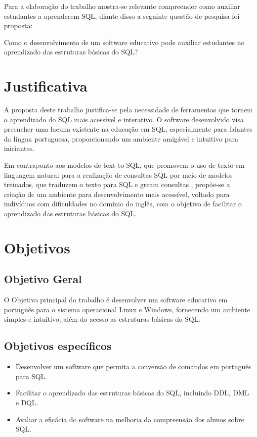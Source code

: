 Para a elaboração do trabalho mostra-se relevante compreender como auxiliar
estudantes a aprenderem SQL, diante disso a seguinte questão de pesquisa foi
proposta:

Como o desenvolvimento de um software educativo pode auxiliar estudantes no
aprendizado das estruturas básicas do SQL?

\section{Justificativa}
A proposta deste trabalho justifica-se pela necessidade de ferramentas que
tornem o aprendizado do SQL mais acessível e interativo. O software
desenvolvido visa preencher uma lacuna existente na educação em SQL,
especialmente para falantes da língua portuguesa, proporcionando um ambiente
amigável e intuitivo para iniciantes.

Em contraponto aos modelos de text-to-SQL, que promovem o uso de texto em
linguagem natural para a realização de consultas SQL por meio de modelos
treinados, que traduzem o texto para SQL e gream consultas \cite{Jose2023},
propõe-se a criação de um ambiente para desenvolvimento mais acessível, voltado
para indivíduos com dificuldades no domínio do inglês, com o objetivo de
facilitar o aprendizado das estruturas básicas do SQL.



\section{Objetivos}

\subsection{Objetivo Geral}

O Objetivo principal do trabalho é desenvolver um software educativo em
português para o sistema operacional Linux e Windows, fornecendo um ambiente
simples e intuitivo, além do acesso as estruturas básicas do SQL.

\subsection{Objetivos específicos}
\begin{itemize}
   \item Desenvolver um software que permita a conversão de comandos em português para
         SQL.
   \item Facilitar o aprendizado das estruturas básicas do SQL, incluindo DDL, DML e
         DQL.
   \item Avaliar a eficácia do software na melhoria da compreensão dos alunos sobre SQL.
\end{itemize}

